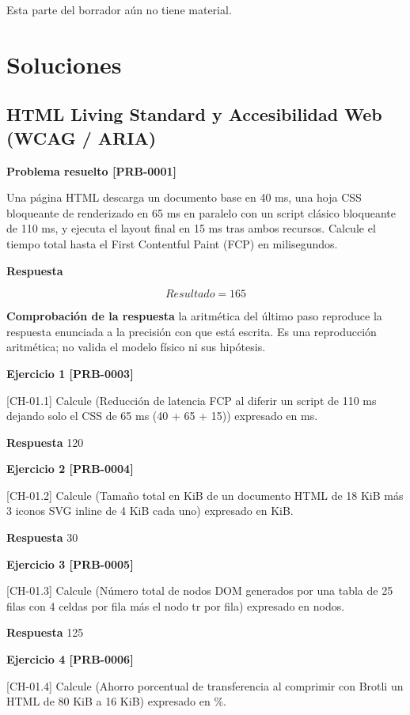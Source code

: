 \documentclass{book}
\begin{document}
\noindent Esta parte del borrador aún no tiene material.
\chapter{Soluciones}

\section{HTML Living Standard y Accesibilidad Web (WCAG / ARIA)}

\noindent\textbf{Problema resuelto [PRB-0001]}

Una página HTML descarga un documento base en 40 ms, una hoja CSS bloqueante de renderizado en 65 ms en paralelo con un script clásico bloqueante de 110 ms, y ejecuta el layout final en 15 ms tras ambos recursos. Calcule el tiempo total hasta el First Contentful Paint (FCP) en milisegundos.

\noindent\textbf{Respuesta}

\[
Resultado = 165
\]

\noindent\textbf{Comprobación de la respuesta} la aritmética del último paso reproduce la respuesta enunciada a la precisión con que está escrita. Es una reproducción aritmética; no valida el modelo físico ni sus hipótesis.

\noindent\textbf{Ejercicio 1 [PRB-0003]}

[CH-01.1] Calcule (Reducción de latencia FCP al diferir un script de 110 ms dejando solo el CSS de 65 ms (40 + 65 + 15)) expresado en ms.

\noindent\textbf{Respuesta} 120

\noindent\textbf{Ejercicio 2 [PRB-0004]}

[CH-01.2] Calcule (Tamaño total en KiB de un documento HTML de 18 KiB más 3 iconos SVG inline de 4 KiB cada uno) expresado en KiB.

\noindent\textbf{Respuesta} 30

\noindent\textbf{Ejercicio 3 [PRB-0005]}

[CH-01.3] Calcule (Número total de nodos DOM generados por una tabla de 25 filas con 4 celdas por fila más el nodo tr por fila) expresado en nodos.

\noindent\textbf{Respuesta} 125

\noindent\textbf{Ejercicio 4 [PRB-0006]}

[CH-01.4] Calcule (Ahorro porcentual de transferencia al comprimir con Brotli un HTML de 80 KiB a 16 KiB) expresado en \%.
\end{document}
